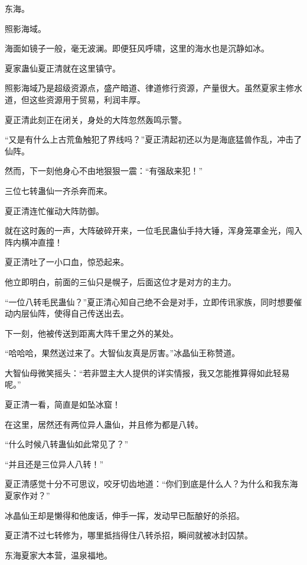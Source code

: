 
\begin{this_body}



东海。

照影海域。

海面如镜子一般，毫无波澜。即便狂风呼啸，这里的海水也是沉静如冰。

夏家蛊仙夏正清就在这里镇守。

照影海域乃是超级资源点，盛产暗道、律道修行资源，产量很大。虽然夏家主修水道，但这些资源用于贸易，利润丰厚。

夏正清此刻正在闭关，身处的大阵忽然轰鸣示警。

“又是有什么上古荒鱼触犯了界线吗？”夏正清起初还以为是海底猛兽作乱，冲击了仙阵。

然而，下一刻他身心不由地狠狠一震：“有强敌来犯！”

三位七转蛊仙一齐杀奔而来。

夏正清连忙催动大阵防御。

就在这时轰的一声，大阵破碎开来，一位毛民蛊仙手持大锤，浑身笼罩金光，闯入阵内横冲直撞！

夏正清吐了一小口血，惊恐起来。

他立即明白，前面的三仙只是幌子，后面这位才是对方的主力。

“一位八转毛民蛊仙？”夏正清心知自己绝不会是对手，立即传讯家族，同时想要催动内层仙阵，使得自己传送出去。

下一刻，他被传送到距离大阵千里之外的某处。

“哈哈哈，果然送过来了。大智仙友真是厉害。”冰晶仙王称赞道。

大智仙母微笑摇头：“若非盟主大人提供的详实情报，我又怎能推算得如此轻易呢。”

夏正清一看，简直是如坠冰窟！

在这里，居然还有两位异人蛊仙，并且修为都是八转。

“什么时候八转蛊仙如此常见了？”

“并且还是三位异人八转！”

夏正清感觉十分不可思议，咬牙切齿地道：“你们到底是什么人？为什么和我东海夏家作对？”

冰晶仙王却是懒得和他废话，伸手一挥，发动早已酝酿好的杀招。

夏正清不过七转修为，哪里抵挡得住八转杀招，瞬间就被冰封囚禁。

东海夏家大本营，温泉福地。


\end{this_body}
